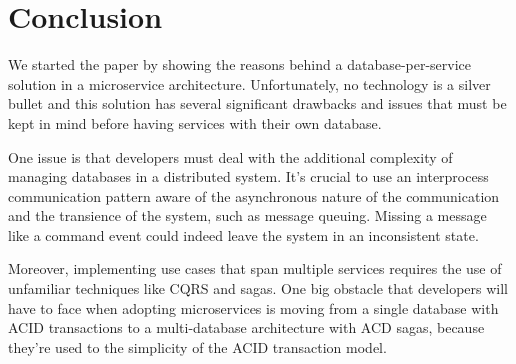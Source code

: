 \documentclass[conference]{IEEEtran}
\begin{document}
%





\section{Conclusion}

We started the paper by showing the reasons behind a database-per-service solution in a microservice architecture. Unfortunately, no technology is a silver bullet and this solution has several significant drawbacks and issues that must be kept in mind before having services with their own database.

One issue is that developers must deal with the additional complexity of managing databases in a distributed system. It's crucial to use an interprocess communication pattern aware of the asynchronous nature of the communication and the transience of the system, such as message queuing. Missing a message like a command event could indeed leave the system in an inconsistent state.

Moreover, implementing use cases that span multiple services requires the use of unfamiliar techniques like CQRS and sagas. One big obstacle that developers will have to face when adopting microservices is moving from a single database with ACID transactions to a multi-database architecture with ACD sagas, because they’re used to the simplicity of the ACID transaction model.
\end{document}
